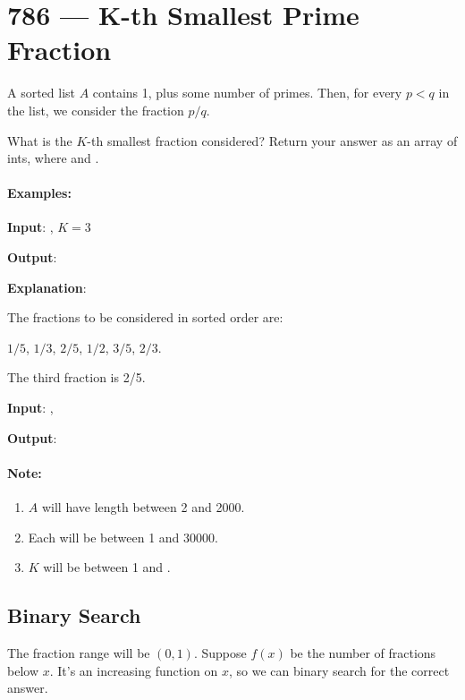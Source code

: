 \section{786 --- K-th Smallest Prime Fraction}
A sorted list $A$ contains 1, plus some number of primes. Then, for every $p < q$ in the list, we consider the fraction $p/q$.

What is the $K$-th smallest fraction considered?  Return your answer as an array of ints, where  and .

\paragraph{Examples:}
\begin{flushleft}


\textbf{Input}: , $K = 3$

\textbf{Output}: \fcj{[2, 5]}

\textbf{Explanation}:

The fractions to be considered in sorted order are:

$1/5$, $1/3$, $2/5$, $1/2$, $3/5$, $2/3$.

The third fraction is 2/5.

\textbf{Input}: , 

\textbf{Output}: \fcj{[1, 7]}

\end{flushleft}

\paragraph{Note:}

\begin{enumerate}
\item $A$ will have length between 2 and 2000.

\item Each  will be between 1 and 30000.

\item $K$ will be between 1 and .
\end{enumerate}

\subsection{Binary Search}
The fraction range will be $(0, 1)$. Suppose $f(x)$ be the number of fractions below $x$. It's an increasing function on $x$, so we can binary search for the correct answer.

